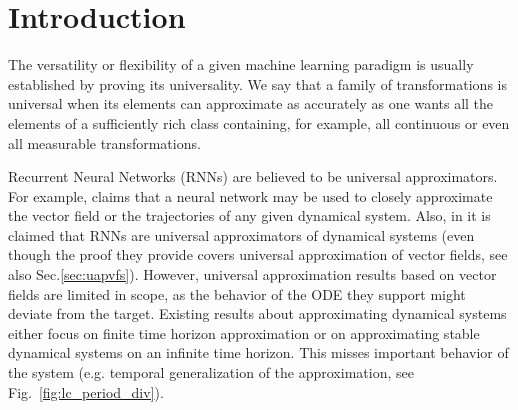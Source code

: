 \documentclass{article}
\theoremstyle{definition} \newtheorem{definition}{Definition}
\theoremstyle{remark} \newtheorem{remark}{Remark}
\newcounter{ct}
\begin{document}



\section{Introduction}
The versatility or flexibility of a given machine learning paradigm is usually established by proving its universality.
We say that a family of transformations is universal when its elements can approximate as accurately as one wants all the elements of a sufficiently rich class containing, for example, all continuous or even all measurable transformations.


Recurrent Neural Networks (RNNs) are believed to be universal approximators.
For example, \citet{durstewitz2023reconstructing} claims that 
 a neural network may be used to closely approximate the vector field or the trajectories of any given dynamical system.
 Also, in \citep{dinc2025latentcomputing} it is claimed that RNNs are universal approximators of dynamical systems (even though the proof they provide covers universal approximation of vector fields, see also Sec.\ref{sec:uapvfs}). 
However, universal approximation results based on vector fields are limited in scope, as the behavior of the ODE they support might deviate from the target.
Existing results about approximating dynamical systems either focus on finite time horizon approximation or on approximating stable dynamical systems on an infinite time horizon.
This misses important behavior of the system (e.g. temporal generalization of the approximation, see Fig.~\ref{fig:lc_period_div}).
\end{document}
